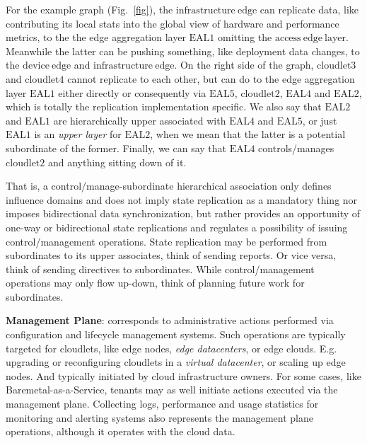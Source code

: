 \documentclass[conference]{IEEEtran}
\begin{document}
For the example graph (Fig.~\ref{fig}), the $\mathrm{infrastructure\ edge}$ can
replicate data, like contributing its local stats into the global view of
hardware and performance metrics, to the the edge aggregation layer
$\mathrm{EAL1}$ omitting the $\mathrm{access\ edge\ layer}$. Meanwhile the
latter can be pushing something, like deployment data changes, to the
$\mathrm{device\ edge}$ and $\mathrm{infrastructure\ edge}$. On the right side
of the graph, $\mathrm{cloudlet3}$ and $\mathrm{cloudlet4}$ cannot replicate to
each other, but can do to the edge aggregation layer $\mathrm{EAL1}$ either
directly or consequently via $\mathrm{EAL5}$, $\mathrm{cloudlet2}$,
$\mathrm{EAL4}$ and $\mathrm{EAL2}$, which is totally the replication
implementation specific. We also say that $\mathrm{EAL2}$ and $\mathrm{EAL1}$
are hierarchically upper associated with $\mathrm{EAL4}$ and $\mathrm{EAL5}$,
or just $\mathrm{EAL1}$ is an \textit{upper layer} for $\mathrm{EAL2}$, when we
mean that the latter is a potential subordinate of the former. Finally, we can
say that $\mathrm{EAL4}$ controls/manages $\mathrm{cloudlet2}$ and anything
sitting down of it.

That is, a control/manage-subordinate hierarchical association only defines
influence domains and does not imply state replication as a mandatory thing nor
imposes bidirectional data synchronization, but rather provides an opportunity
of one-way or bidirectional state replications and regulates a possibility of
issuing control/management operations. State replication may be performed from
subordinates to its upper associates, think of sending reports. Or vice versa,
think of sending directives to subordinates. While control/management
operations may only flow up-down, think of planning future work for
subordinates.

\textbf{Management Plane}: corresponds to administrative actions performed via
configuration and lifecycle management systems. Such operations are typically
targeted for cloudlets, like edge nodes, \textit{edge datacenters}\cite{b3},
or edge clouds. E.g. upgrading or reconfiguring cloudlets in a \textit{virtual
datacenter}\cite{b3}, or scaling up edge nodes. And typically initiated by
cloud infrastructure owners. For some cases, like Baremetal-as-a-Service,
tenants may as well initiate actions executed via the management plane.
Collecting logs, performance and usage statistics for monitoring and alerting
systems also represents the management plane operations, although it operates
with the cloud data.
\end{document}
